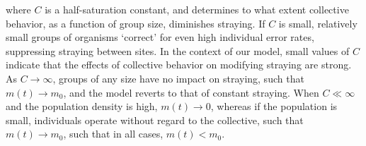 \documentclass{revtex4}
\begin{document}
\noindent where $C$ is a half-saturation constant, and determines to what extent collective behavior, as a function of group size, diminishes straying.
If $C$ is small, relatively small groups of organisms `correct' for even high individual error rates, suppressing straying between sites.
In the context of our model, small values of $C$ indicate that the effects of collective behavior on modifying straying are strong.
As $C \rightarrow \infty$, groups of any size have no impact on straying, such that $m(t) \rightarrow m_0$, and the model reverts to that of constant straying.
When $C \ll \infty$ and the population density is high, $m(t) \rightarrow 0$, whereas if the population is small, individuals operate without regard to the collective, such that $m(t) \rightarrow m_0$, such that in all cases, $m(t) < m_0$.


\end{document}
